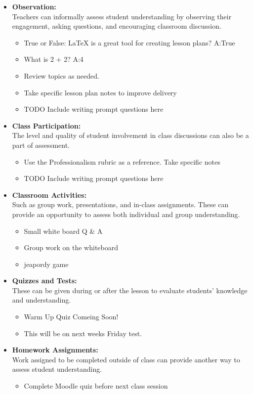 \documentclass[main.tex]{subfiles}
\begin{document}
\begin{itemize}

  \item \textbf{Observation:}\\
    Teachers can informally assess student understanding by observing their engagement, asking questions, and encouraging classroom discussion.
    \begin{itemize}
      \item True or False: \LaTeX{} is a great tool for creating lesson plans? A:True 
      \item What is 2 + 2? A:4
      \item Review topics as needed.
      \item Take specific lesson plan notes to improve delivery
      \item TODO Include writing prompt questions here
    \end{itemize}

  \item \textbf{Class Participation:}\\
    The level and quality of student involvement in class discussions can also be a part of assessment.
    \begin{itemize}
      \item Use the Professionalism rubric as a reference. Take specific notes  
      \item TODO Include writing prompt questions here
    \end{itemize}

  \item \textbf{Classroom Activities:}\\ 
    Such as group work, presentations, and in-class assignments. These can provide an opportunity to assess both individual and group understanding.
    \begin{itemize}
      \item Small white board Q \& A 
      \item Group work on the whiteboard
      \item jeapordy game
    \end{itemize}

  \item \textbf{Quizzes and Tests:}\\
    These can be given during or after the lesson to evaluate students' knowledge and understanding.
    \begin{itemize}
      \item Warm Up Quiz Comeing Soon!
      \item This will be on next weeks Friday test.
    \end{itemize}

  \item \textbf{Homework Assignments:}\\
    Work assigned to be completed outside of class can provide another way to assess student understanding.
    \begin{itemize}
      \item Complete Moodle quiz before next class session 
    \end{itemize}

\end{itemize}
\end{document}
